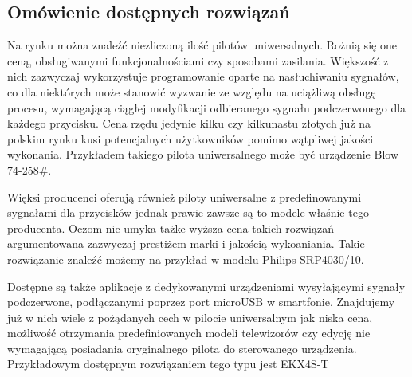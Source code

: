 \documentclass[12pt,twoside]{article}
\begin{document}
\subsection{Omówienie dostępnych rozwiązań}
{Na rynku można znaleźć niezliczoną ilość pilotów uniwersalnych. Rożnią się one 
ceną, obsługiwanymi funkcjonalnościami czy sposobami zasilania. Większość z nich zazwyczaj 
wykorzystuje programowanie oparte na nasłuchiwaniu sygnałów, co dla niektórych może stanowić 
wyzwanie ze względu na uciążliwą obsługę procesu, wymagającą ciągłej modyfikacji odbieranego 
sygnału podczerwonego dla każdego przycisku. Cena rzędu jedynie kilku czy kilkunastu złotych 
już na polskim rynku kusi potencjalnych użytkowników pomimo wątpliwej jakości wykonania. Przykładem 
takiego pilota uniwersalnego może być urządzenie Blow 74-258\#\cite{cheapController}. 

Więksi producenci oferują również piloty uniwersalne z predefinowanymi sygnałami dla przycisków jednak
prawie zawsze są to modele właśnie tego producenta. Oczom nie umyka tażke wyższa cena takich
rozwiązań argumentowana zazwyczaj prestiżem marki i jakością wykoaniania. Takie rozwiązanie znaleźć
możemy na przykład w modelu Philips SRP4030/10\cite{expensiveController}.

Dostępne są także aplikacje z dedykowanymi urządzeniami wysyłającymi sygnały podczerwone, 
podłączanymi poprzez port microUSB w smartfonie. Znajdujemy już w nich wiele z pożądanych cech w pilocie
 uniwersalnym jak niska cena, możliwość otrzymania predefiniowanych modeli telewizorów 
 czy edycję nie wymagającą posiadania oryginalnego pilota do sterowanego urządzenia. Przykładowym dostępnym
  rozwiązaniem tego typu jest EKX4S-T \cite{appController}}
\end{document}
